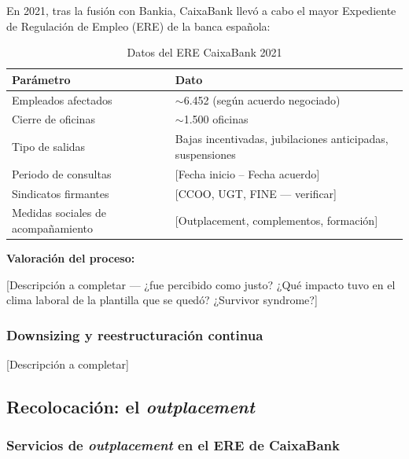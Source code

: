 En 2021, tras la fusión con Bankia, CaixaBank llevó a cabo el mayor
Expediente de Regulación de Empleo (ERE) de la banca española:

\begin{table}[H]
  \centering
  \small
  \caption{Datos del ERE CaixaBank 2021}
  \begin{tabularx}{\textwidth}{lX}
    \toprule
    \textbf{Parámetro}           & \textbf{Dato} \\
    \midrule
    Empleados afectados           & $\sim$6.452 (según acuerdo negociado) \\
    Cierre de oficinas            & $\sim$1.500 oficinas \\
    Tipo de salidas               & Bajas incentivadas, jubilaciones anticipadas, suspensiones \\
    Periodo de consultas          & [Fecha inicio – Fecha acuerdo] \\
    Sindicatos firmantes          & [CCOO, UGT, FINE — verificar] \\
    Medidas sociales de acompañamiento & [Outplacement, complementos, formación] \\
    \bottomrule
  \end{tabularx}
\end{table}

\textbf{Valoración del proceso:}

[Descripción a completar — ¿fue percibido como justo? ¿Qué impacto tuvo
en el clima laboral de la plantilla que se quedó? ¿Survivor syndrome?]

\subsubsection{Downsizing y reestructuración continua}


[Descripción a completar]

\subsection{Recolocación: el \textit{outplacement}}

\subsubsection{Servicios de \textit{outplacement} en el ERE de CaixaBank}

